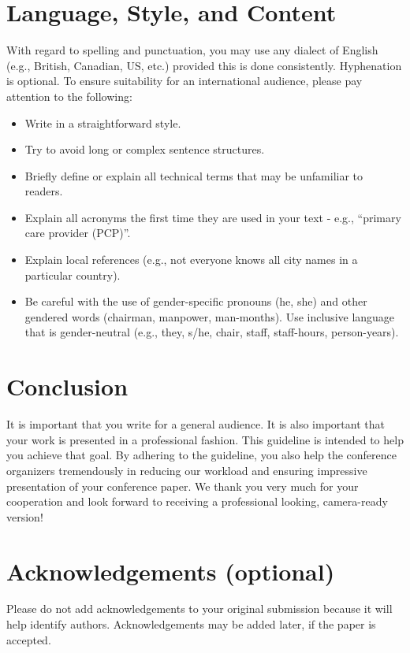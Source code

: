 \documentclass{icis}
\begin{document}
\section{Language, Style, and Content}
With regard to spelling and punctuation, you may use any dialect of English
(e.g., British, Canadian, US, etc.) provided this is done
consistently. Hyphenation is optional. To ensure suitability for an
international audience, please pay attention to the following:

\begin{itemize}
\item Write in a straightforward style.
\item Try to avoid long or complex sentence structures.
\item Briefly define or explain all technical terms that may be unfamiliar to
  readers.
\item Explain all acronyms the first time they are used in your text - e.g.,
  ``primary care provider (PCP)''.
\item Explain local references (e.g., not everyone knows all city names in a
  particular country).
\item Be careful with the use of gender-specific pronouns (he, she) and other
  gendered words (chairman, manpower, man-months). Use inclusive language that
  is gender-neutral (e.g., they, s/he, chair, staff, staff-hours, person-years).
\end{itemize}

\section{Conclusion}
It is important that you write for a general audience. It is also important that your work is presented in a professional fashion. This guideline is intended to help you achieve that goal. By adhering to the guideline, you also help the conference organizers tremendously in reducing our workload and ensuring impressive presentation of your conference paper. We thank you very much for your cooperation and look forward to receiving a professional looking, camera-ready version! 

\section{Acknowledgements (optional)}
Please do not add acknowledgements to your original submission because it will help identify authors. Acknowledgements may be added later, if the paper is accepted.
\end{document}

